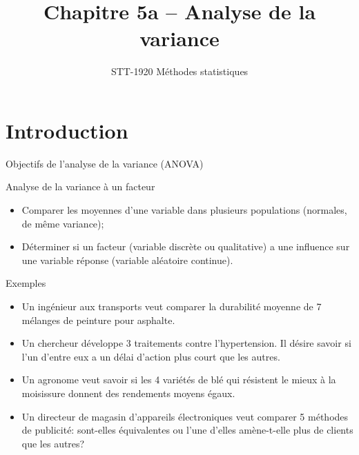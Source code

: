 \documentclass{BeamerTemplate}
\title{Chapitre 5a -- Analyse de la variance}
\subtitle{STT-1920 Méthodes statistiques}
\date{}
\begin{document}
\begin{frame}[t]
  \titlepage
\end{frame}

\section{Introduction}

\begin{frame}[t]{Objectifs de l'analyse de la variance (ANOVA)}

\begin{Boite}{Analyse de la variance à un facteur}
\begin{itemize}
  \item Comparer les \alert{moyennes} d'une variable dans \alert{plusieurs populations}
  (normales, de même variance);
  \item Déterminer si un \alert{facteur} (variable discrète ou qualitative) a une
  influence sur une \alert{variable réponse} (variable aléatoire continue).
\end{itemize}
\end{Boite}

\end{frame}

\begin{frame}[t]{Exemples}

\begin{itemize}\itemsep3mm
  \item Un ingénieur aux transports veut comparer la durabilité moyenne de
  7 mélanges de peinture pour asphalte.
  \item<2-> Un chercheur développe 3 traitements contre l'hypertension. Il désire
  savoir si l'un d'entre eux a un délai d'action plus court que les autres.
  \item<3-> Un agronome veut savoir si les 4 variétés de blé qui résistent le mieux
  à la moisissure donnent des rendements moyens égaux.
  \item<4-> Un directeur de magasin d'appareils électroniques veut comparer
  5 méthodes de publicité: sont-elles équivalentes ou l'une d'elles
  amène-t-elle plus de clients que les autres?
\end{itemize}

\end{frame}

\end{document}
